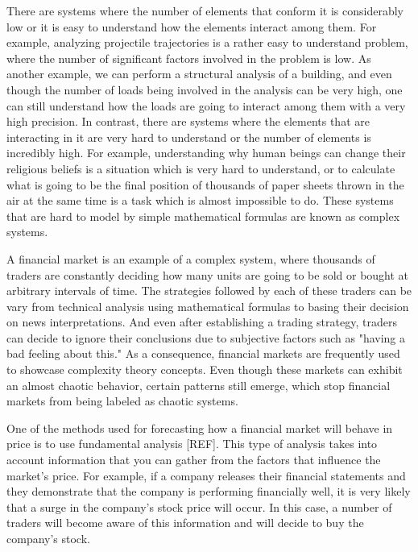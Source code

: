 There are systems where the number of elements that conform it is considerably low or it is easy to understand how the elements interact among them. For example, analyzing projectile trajectories is a rather easy to understand problem, where the number of significant factors involved in the problem is low. As another example, we can perform a structural analysis of a building, and even though the number of loads being involved in the analysis can be very high, one can still understand how the loads are going to interact among them with a very high precision. In contrast, there are systems where the elements that are interacting in it are very hard to understand or the number of elements is incredibly high. For example, understanding why human beings can change their religious beliefs is a situation which is very hard to understand, or to calculate what is going to be the final position of thousands of paper sheets thrown in the air at the same time is a task which is almost impossible to do. These systems that are hard to model by simple mathematical formulas are known as complex systems.

A financial market is an example of a complex system, where thousands of traders are constantly deciding how many units are going to be sold or bought at arbitrary intervals of time. The strategies followed by each of these traders can be vary from technical analysis using mathematical formulas to basing their decision on news interpretations. And even after establishing a trading strategy, traders can decide to ignore their conclusions due to subjective factors such as "having a bad feeling about this." As a consequence, financial markets are frequently used to showcase complexity theory concepts. Even though these markets can exhibit an almost chaotic behavior, certain patterns still emerge, which stop financial markets from being labeled as chaotic systems. 


One of the methods used for forecasting how a financial market will behave in price is to use fundamental analysis [REF]. This type of analysis takes into account information that you can gather from the factors that influence the market's price. For example, if a company releases their financial statements and they demonstrate that the company is performing financially well, it is very likely that a surge in the company's stock price will occur. In this case, a number of traders will become aware of this information and will decide to buy the company's stock.


